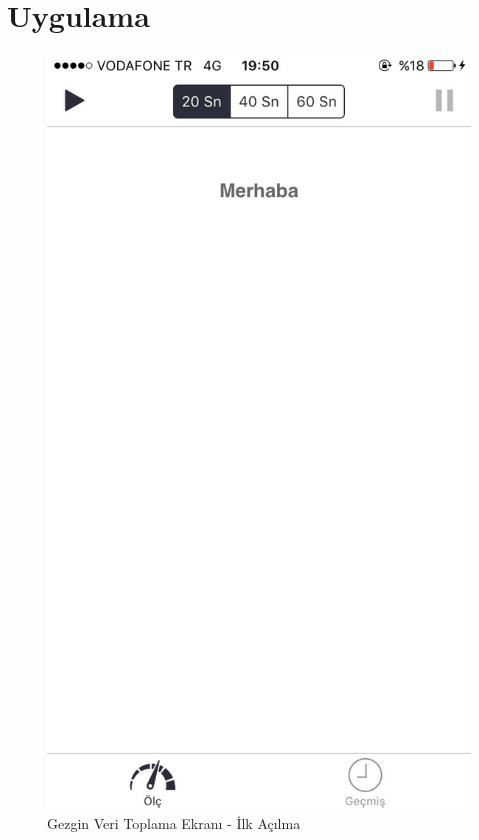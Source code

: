 \chapter{Uygulama}
\begin{figure}[!htbp]
\centering
\includegraphics[scale=0.2]{projectChapters/images/IMG_0374.jpg}
\caption{Gezgin Veri Toplama Ekranı - İlk Açılma}
\end{figure}


